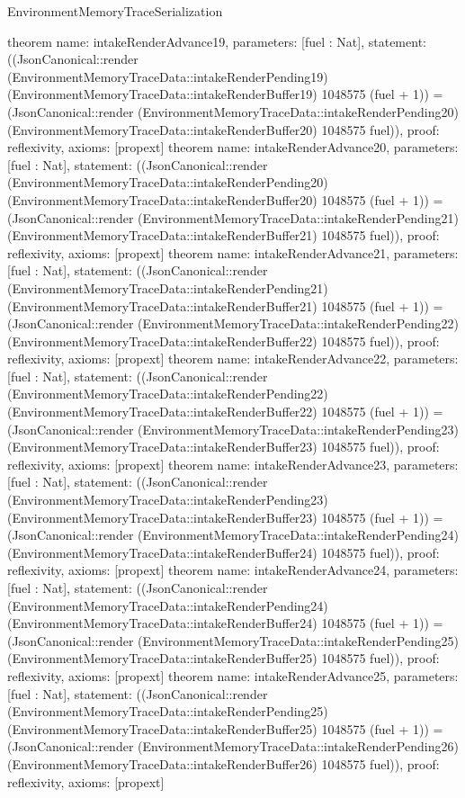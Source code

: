 \begin{lexlean}{EnvironmentMemoryTraceSerialization}
\begin{semanticmodule}
{}
theorem{
 name: intakeRenderAdvance19, parameters: [fuel : Nat],
 statement: ((JsonCanonical::render (EnvironmentMemoryTraceData::intakeRenderPending19) (EnvironmentMemoryTraceData::intakeRenderBuffer19) 1048575 (fuel + 1)) = (JsonCanonical::render (EnvironmentMemoryTraceData::intakeRenderPending20) (EnvironmentMemoryTraceData::intakeRenderBuffer20) 1048575 fuel)), proof: reflexivity{}, axioms: [propext]
}
theorem{
 name: intakeRenderAdvance20, parameters: [fuel : Nat],
 statement: ((JsonCanonical::render (EnvironmentMemoryTraceData::intakeRenderPending20) (EnvironmentMemoryTraceData::intakeRenderBuffer20) 1048575 (fuel + 1)) = (JsonCanonical::render (EnvironmentMemoryTraceData::intakeRenderPending21) (EnvironmentMemoryTraceData::intakeRenderBuffer21) 1048575 fuel)), proof: reflexivity{}, axioms: [propext]
}
theorem{
 name: intakeRenderAdvance21, parameters: [fuel : Nat],
 statement: ((JsonCanonical::render (EnvironmentMemoryTraceData::intakeRenderPending21) (EnvironmentMemoryTraceData::intakeRenderBuffer21) 1048575 (fuel + 1)) = (JsonCanonical::render (EnvironmentMemoryTraceData::intakeRenderPending22) (EnvironmentMemoryTraceData::intakeRenderBuffer22) 1048575 fuel)), proof: reflexivity{}, axioms: [propext]
}
theorem{
 name: intakeRenderAdvance22, parameters: [fuel : Nat],
 statement: ((JsonCanonical::render (EnvironmentMemoryTraceData::intakeRenderPending22) (EnvironmentMemoryTraceData::intakeRenderBuffer22) 1048575 (fuel + 1)) = (JsonCanonical::render (EnvironmentMemoryTraceData::intakeRenderPending23) (EnvironmentMemoryTraceData::intakeRenderBuffer23) 1048575 fuel)), proof: reflexivity{}, axioms: [propext]
}
theorem{
 name: intakeRenderAdvance23, parameters: [fuel : Nat],
 statement: ((JsonCanonical::render (EnvironmentMemoryTraceData::intakeRenderPending23) (EnvironmentMemoryTraceData::intakeRenderBuffer23) 1048575 (fuel + 1)) = (JsonCanonical::render (EnvironmentMemoryTraceData::intakeRenderPending24) (EnvironmentMemoryTraceData::intakeRenderBuffer24) 1048575 fuel)), proof: reflexivity{}, axioms: [propext]
}
theorem{
 name: intakeRenderAdvance24, parameters: [fuel : Nat],
 statement: ((JsonCanonical::render (EnvironmentMemoryTraceData::intakeRenderPending24) (EnvironmentMemoryTraceData::intakeRenderBuffer24) 1048575 (fuel + 1)) = (JsonCanonical::render (EnvironmentMemoryTraceData::intakeRenderPending25) (EnvironmentMemoryTraceData::intakeRenderBuffer25) 1048575 fuel)), proof: reflexivity{}, axioms: [propext]
}
theorem{
 name: intakeRenderAdvance25, parameters: [fuel : Nat],
 statement: ((JsonCanonical::render (EnvironmentMemoryTraceData::intakeRenderPending25) (EnvironmentMemoryTraceData::intakeRenderBuffer25) 1048575 (fuel + 1)) = (JsonCanonical::render (EnvironmentMemoryTraceData::intakeRenderPending26) (EnvironmentMemoryTraceData::intakeRenderBuffer26) 1048575 fuel)), proof: reflexivity{}, axioms: [propext]
}
\end{semanticmodule}
\end{lexlean}
